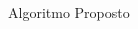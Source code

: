 \documentclass[final]{beamer}
\begin{document}
\begin{frame}[t]
\begin{columns}[t]
\begin{column}{0.35\paperwidth}
\begin{block}{Algoritmo Proposto}
	
	\end{block}
	
%


\end{column}


\end{columns}
\end{frame}
\end{document}
